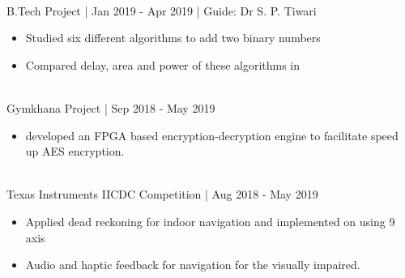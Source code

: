 \documentclass[]{resume}
\begin{document}
\begin{minipage}[t]{0.69\textwidth}
\vspace{-0.8em}
\hspace{0.5em}
\\
\hspace*{0.5em} B.Tech Project | Jan 2019 - Apr 2019 | Guide: Dr S. P. Tiwari\\ 
\vspace{-2em}
\descript{}
\begin{itemize}
    \item Studied six different algorithms to add two binary numbers 
    \vspace{-0.6em}\\
    \item Compared delay, area and power of these algorithms in 
\end{itemize}
\sectionsep

\vspace{-0.8em}
\hspace{0.5em}
\\
\hspace*{0.5em} Gymkhana Project | Sep 2018 - May 2019   \\ 
\vspace{-2em}
\descript{}
\begin{itemize}
    \item developed an FPGA based encryption-decryption engine to facilitate speed up AES encryption.
\end{itemize}
\sectionsep

\vspace{-0.8em}
\hspace{0.5em}
\\
\hspace*{0.7em}Texas Instruments IICDC Competition | Aug 2018 - May 2019\\ 
\vspace{-2em}
\descript{}
\begin{itemize}
    \item Applied dead reckoning for indoor navigation and implemented on  using 9 axis 
    \vspace{-0.6em}\\
    \item Audio and haptic feedback for navigation for the visually impaired.
\end{itemize}
\sectionsep
\vspace{-1.8em}


\end{minipage}
\end{document}
